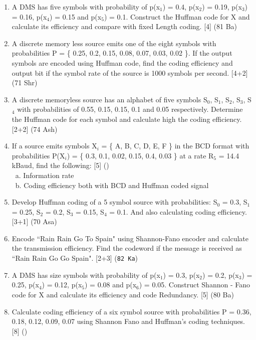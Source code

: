 \documentclass[12pt]{article}
\newcommand{\enter}{\\\textcolor{white}{1}}
\begin{document}
\begin{enumerate}
        \item A DMS has five symbols with probability of p(x$_1$) = 0.4, p(x$_2$) = 0.19, p(x$_3$) = 0.16, p(x$_4$) = 0.15 and p(x$_5$) = 0.1. Construct the Huffman code for X and calculate its efficiency and compare with fixed Length coding. \hfill [4] (81 Ba)
        
        \item A discrete memory less source emits one of the eight symbols with probabilities P = \{ 0.25, 0.2, 0.15, 0.08, 0.07, 0.03, 0.02 \}. If the output symbols are encoded using Huffman code, find the coding efficiency and output bit if the symbol rate of the source is 1000 symbols per second. \hfill [4+2] (71 Shr)
        
        \item A discrete memoryless source has an alphabet of five symbols S$_0$, S$_1$, S$_2$, S$_3$, S$_4$ with probabilities of 0.55, 0.15, 0.15, 0.1 and 0.05 respectively. Determine the Huffman code for each symbol and calculate high the coding efficiency. \hfill [2+2] (74 Ash)
        
        \item If a source emits symbols X$_i$ = \{ A, B, C, D, E, F \} in the BCD format with probabilities P(X$_i$) = \{ 0.3, 0.1, 0.02, 0.15, 0.4, 0.03 \} at a rate R$_5$ = 14.4 kBaud, find the following: \hfill [5] ()
        \enter a. Information rate
        \enter b. Coding efficiency both with BCD and Huffman coded signal
        
        \item Develop Huffman coding of a 5 symbol source with probabilities: S$_0$ = 0.3, S$_1$ = 0.25, S$_2$ = 0.2, S$_3$ = 0.15, S$_4$ = 0.1. And also calculating coding efficiency. \hfill [3+1] (70 Asa)
        
        \item Encode ``Rain Rain Go To Spain" using Shannon-Fano encoder and calculate the transmission efficiency. Find the codeword if the message is received as ``Rain Rain Go Go Spain". \hfill [2+3] (\texttt{82 Ka})
        \item A DMS has size symbols with probability of p(x$_1$) = 0.3, p(x$_2$) = 0.2, p(x$_3$) = 0.25, p(x$_4$) = 0.12, p(x$_5$) = 0.08 and p(x$_6$) = 0.05. Construct Shannon - Fano code for X and calculate its efficiency and code Redundancy. \hfill [5] (80 Ba)
        
        \item Calculate coding efficiency of a six symbol source with probabilities P = { 0.36, 0.18, 0.12, 0.09, 0.07 } using Shannon Fano and Huffman's coding techniques. \hfill [8] ()
        

\end{enumerate}
\end{document}
